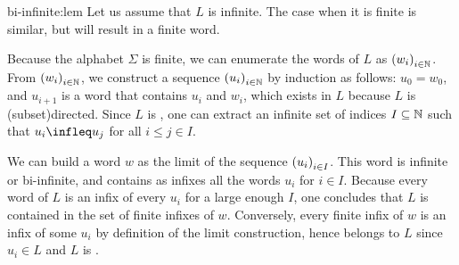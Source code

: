 \begin{proofof}{bi-infinite:lem}
    Let us assume that $L$ is infinite. The case when it is finite 
    is similar, but will result in a finite word.

    Because the alphabet $\Sigma$ is finite, we can enumerate the words of $L$
    as $\seqof{w_i}[i \in \Nat]$. From $\seqof{w_i}[i \in \Nat]$, we construct a sequence $\seqof{u_i}[i \in \Nat]$ by induction
    as follows: $u_0 = w_0$, and $u_{i+1}$ is a word that contains $u_i$ and
    $w_i$, which exists in $L$ because $L$ is \kl(subset){directed}. Since $L$ is
    , one can extract an infinite set of indices $I
    \subseteq \mathbb{N}$ such that $u_i \infleq u_{j}$ for all $i \leq j \in I$.

    We can build a word $w$ as the limit of the sequence $\seqof{u_i}[i \in
    I]$. This word is infinite or bi-infinite, and contains as infixes all the
    words $u_i$ for $i \in I$. Because every word of $L$ is an infix of every
    $u_i$ for a large enough $I$, one concludes that $L$ is contained in the
    set of finite infixes of $w$. Conversely, every finite infix of $w$ is 
    an infix of some $u_i$ by definition of the limit construction, hence
    belongs to $L$ since $u_i \in L$ and $L$ is .
\end{proofof}

